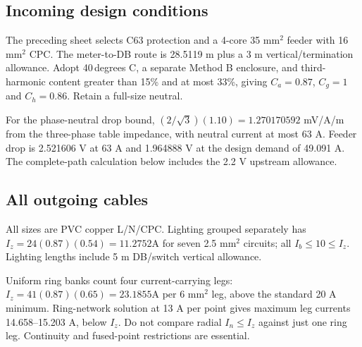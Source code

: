 \subsection*{Incoming design conditions}
The preceding sheet selects C63 protection and a 4-core 35 mm$^2$ feeder with 16 mm$^2$ CPC. The meter-to-DB route is 28.5119 m plus a 3 m vertical/termination allowance. Adopt 40\,degrees C, a separate Method B enclosure, and third-harmonic content greater than 15\% and at most 33\%, giving $C_a=0.87$, $C_g=1$ and $C_h=0.86$. Retain a full-size neutral.

For the phase-neutral drop bound, $(2/\sqrt3)(1.10)=1.270170592$ mV/A/m from the three-phase table impedance, with neutral current at most 63 A. Feeder drop is 2.521606 V at 63 A and 1.964888 V at the design demand of 49.091 A. The complete-path calculation below includes the 2.2 V upstream allowance.

\subsection*{All outgoing cables}
All sizes are PVC copper L/N/CPC. Lighting grouped separately has $I_z=24(0.87)(0.54)=11.2752$A for seven 2.5 mm$^2$ circuits;  all $I_b\le 10\le I_z$. Lighting lengths include 5 m DB/switch vertical allowance.

Uniform ring banks count four current-carrying legs: $I_z=41(0.87)(0.65)=23.1855$A per 6 mm$^2$ leg, above the standard 20 A minimum. Ring-network solution at 13 A per point gives maximum leg currents 14.658--15.203 A, below $I_z$. Do not compare radial $I_n\le I_z$ against just one ring leg. Continuity and fused-point restrictions are essential.


